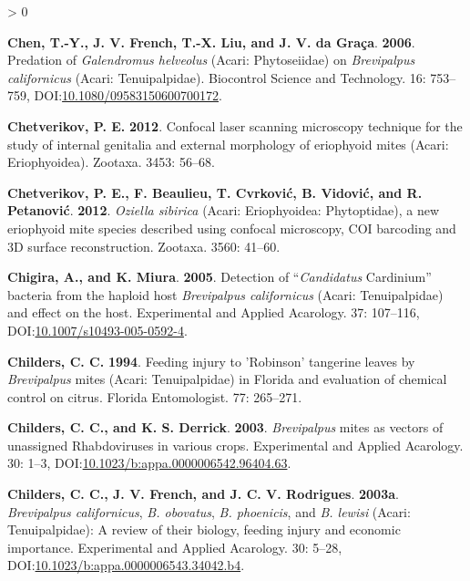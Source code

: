 \documentclass{ufdissertation}[overrideChapters] %
\newlength{\cslhangindent}
\newenvironment{CSLReferences}[2] %
 {%
  \setlength{\parindent}{0pt}
  \ifodd #1 \everypar{\setlength{\hangindent}{\cslhangindent}}\ignorespaces\fi
  \ifnum #2 > 0
  \setlength{\parskip}{#2\baselineskip}
  \fi
 }%
 {}
\begin{document}
{\begin{CSLReferences}{1}{1}
\leavevmode{}%
\textbf{Chen, T.-Y., J. V. French, T.-X. Liu, and J. V. da Graça}. \textbf{2006}. Predation of {\emph{Galendromus helveolus}} ({Acari}: {Phytoseiidae}) on {\emph{Brevipalpus californicus}} ({Acari}: {Tenuipalpidae}). Biocontrol Science and Technology. 16: 753--759, DOI:\href{https://doi.org/10.1080/09583150600700172}{10.1080/09583150600700172}.

\leavevmode{}%
\textbf{Chetverikov, P. E.} \textbf{2012}. Confocal laser scanning microscopy technique for the study of internal genitalia and external morphology of eriophyoid mites ({Acari}: {Eriophyoidea}). Zootaxa. 3453: 56--68.

\leavevmode{}%
\textbf{Chetverikov, P. E., F. Beaulieu, T. Cvrković, B. Vidović, and R. Petanović}. \textbf{2012}. {\emph{Oziella sibirica}} ({Acari}: {Eriophyoidea}: {Phytoptidae}), a new eriophyoid mite species described using confocal microscopy, {COI} barcoding and {3D} surface reconstruction. Zootaxa. 3560: 41--60.

\leavevmode{}%
\textbf{Chigira, A., and K. Miura}. \textbf{2005}. Detection of {``{\emph{Candidatus}} {Cardinium}''} bacteria from the haploid host {\emph{Brevipalpus californicus}} ({Acari}: {Tenuipalpidae}) and effect on the host. Experimental and Applied Acarology. 37: 107--116, DOI:\href{https://doi.org/10.1007/s10493-005-0592-4}{10.1007/s10493-005-0592-4}.

\leavevmode{}%
\textbf{Childers, C. C.} \textbf{1994}. Feeding injury to {'Robinson'} tangerine leaves by {\emph{Brevipalpus}} mites ({Acari}: {Tenuipalpidae}) in {Florida} and evaluation of chemical control on citrus. Florida Entomologist. 77: 265--271.

\leavevmode{}%
\textbf{Childers, C. C., and K. S. Derrick}. \textbf{2003}. {\emph{Brevipalpus}} mites as vectors of unassigned {Rhabdoviruses} in various crops. Experimental and Applied Acarology. 30: 1--3, DOI:\href{https://doi.org/10.1023/b:appa.0000006542.96404.63}{10.1023/b:appa.0000006542.96404.63}.

\leavevmode{}%
\textbf{Childers, C. C., J. V. French, and J. C. V. Rodrigues}. \textbf{2003a}. {\emph{Brevipalpus californicus}}, {\emph{B. obovatus}}, {\emph{B. phoenicis}}, and {\emph{B. lewisi}} ({Acari}: {Tenuipalpidae}): A review of their biology, feeding injury and economic importance. Experimental and Applied Acarology. 30: 5--28, DOI:\href{https://doi.org/10.1023/b:appa.0000006543.34042.b4}{10.1023/b:appa.0000006543.34042.b4}.


\end{CSLReferences}}
\end{document}
